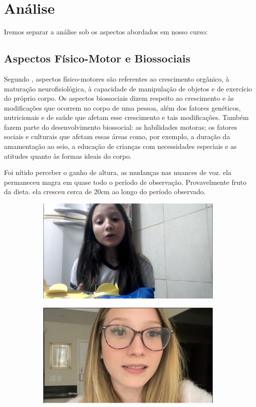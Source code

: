 \section{Análise}

Iremos separar a análise sob os aspectos abordados em nosso curso:

\subsection{Aspectos Físico-Motor e Biossociais}

Segundo , aspectos físico-motores são referentes ao crescimento orgânico, à maturação neurofisiológica, à capacidade de manipulação de objetos e de exercício do próprio corpo.
Os aspectos biossociais dizem respeito ao crescimento e às modificações que ocorrem no corpo de uma pessoa, além dos fatores genéticos, nutricionais e de saúde que afetam esse crescimento e tais modificações. Também fazem parte do desenvolvimento biossocial: as habilidades motoras; os fatores sociais e culturais que afetam essas áreas como, por exemplo, a duração da amamentação ao seio, a educação de crianças com necessidades especiais e as atitudes quanto às formas ideais do corpo.

Foi nítido perceber o ganho de altura, as mudanças nas nuances de voz. ela permaneceu magra em quase todo o período de observação. Provavelmente fruto da dieta. ela cresceu cerca de 20cm ao longo do período observado.


\begin{figure}[h!]
    \centering

    \begin{subfigure}{.5\textwidth}
        \centering
        \includegraphics[width=0.4\linewidth]{fig/Zabetta-13-anos-primeiro-video}
    \end{subfigure}%

    \begin{subfigure}{.5\textwidth}
        \centering
        \includegraphics[width=0.4\linewidth]{fig/Zabetta-18-anos-facul}
    \end{subfigure}%

\end{figure}



